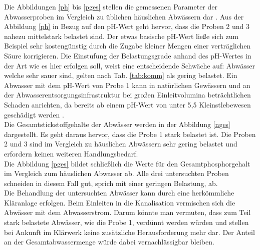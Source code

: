 Die Abbildungen \ref{ph} bis \ref{pges} stellen die gemessenen Parameter der Abwasserproben im Vergleich zu üblichen häuslichen Abwässern dar \cite[S. 29]{Skript}. Aus der Abbildung \ref{ph} in Bezug auf den pH-Wert geht hervor, dass die Proben 2 und 3 nahezu mittelstark belastet sind. Der etwas basische pH-Wert ließe sich zum Beispiel sehr kostengünstig durch die Zugabe kleiner Mengen einer verträglichen Säure korrigieren. Die Einstufung der Belastungsgrade anhand des pH-Wertes in der Art wie es hier erfolgen soll, weist eine entscheidende Schwäche auf:\linebreak
Abwässer welche sehr sauer sind, gelten nach Tab. \ref{tab:komm} als gering belastet. Ein Abwasser mit dem pH-Wert von Probe 1 kann in natürlichen Gewässern und an der Abwasserentsorgungsinfrastruktur bei großen Einleitvolumina beträchtlichen Schaden anrichten, da bereits ab einem pH-Wert von unter 5,5 Kleinstlebewesen geschädigt werden \cite{pHAbwasser}.\\
Die Gesamtstickstoffgehalte der Abwässer werden in der Abbildung \ref{nges} dargestellt. Es geht daraus hervor, dass die Probe 1 stark belastet ist. Die Proben 2 und 3 sind im Vergleich zu häuslichen Abwässern sehr gering belastet und erfordern keinen weiteren Handlungsbedarf.\\
Die Abbildung \ref{pges} bildet schließlich die Werte für den Gesamtphosphorgehalt im Vergleich zum häuslichen Abwasser ab. Alle drei untersuchten Proben schneiden in diesem Fall gut, sprich mit einer geringen Belastung, ab.\\

Die Behandlung der untersuchten Abwässer kann durch eine herkömmliche Kläranlage erfolgen. Beim Einleiten in die Kanalisation vermischen sich die Abwässer mit dem Abwasserstrom. Darum könnte man vermuten, dass zum Teil stark belastete Abwässer, wie die Probe 1, verdünnt werden würden und stellen bei Ankunft im Klärwerk keine zusätzliche Herausforderung mehr dar. Der Anteil an der Gesamtabwassermenge würde dabei vernachlässigbar bleiben.

